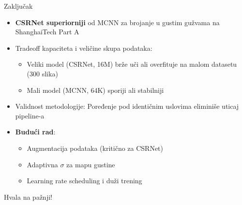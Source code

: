 \documentclass[aspectratio=169]{beamer}
\begin{document}
\begin{frame}{Zaključak}
    \begin{itemize}
        \item \textbf{CSRNet superiorniji} od MCNN za brojanje u gustim gužvama na ShanghaiTech Part A
        \item Tradeoff kapaciteta i veličine skupa podataka:
        \begin{itemize}
            \item Veliki model (CSRNet, 16M) brže uči ali overfituje na malom datasetu (300 slika)
            \item Mali model (MCNN, 64K) sporiji ali stabilniji
        \end{itemize}
        \item Validnost metodologije: Poređenje pod identičnim uslovima eliminiše uticaj pipeline-a
        \item \textbf{Budući rad}:
        \begin{itemize}
            \item Augmentacija podataka (kritično za CSRNet)
            \item Adaptivna $\sigma$ za mapu gustine
            \item Learning rate scheduling i duži trening
        \end{itemize}
    \end{itemize}
    
    \vspace{0.5cm}
    \centering
    Hvala na pažnji!
\end{frame}
\end{document}
